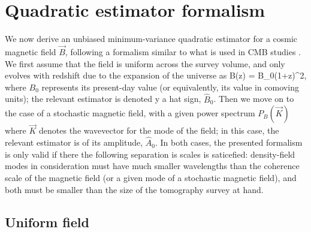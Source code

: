 \section{Quadratic estimator formalism}
\label{sec:estimators}

We now derive an unbiased minimum-variance quadratic estimator for a cosmic magnetic field $\vec B$, following a formalism similar to what is used in CMB studies \cite{2003PhRvD..67h3002O}. We first assume that the field is uniform across the survey volume, and only evolves with redshift due to the expansion of the universe as 
\beq
B(z) = B_0(1+z)^2,
\label{eq:B0}
\eeq
where $B_0$ represents its present-day value (or equivalently, its value in comoving units); the relevant estimator is denoted y a hat sign, $\widehat B_0$. Then we move on to the case of a stochastic magnetic field, with a given power spectrum $P_B(\vec K)$ where $\vec K$ denotes the wavevector for the mode of the field; in this case, the relevant estimator is of its amplitude, $\widehat A_0$. In both cases, the presented formalism is only valid if there the following separation is scales is saticefied: density-field modes in consideration must have much smaller wavelengths than the coherence scale of the magnetic field (or a given mode of a stochastic magnetic field), and both must be smaller than the size of the tomography survey at hand.

\subsection{Uniform field}
\label{subsec:uniform}

